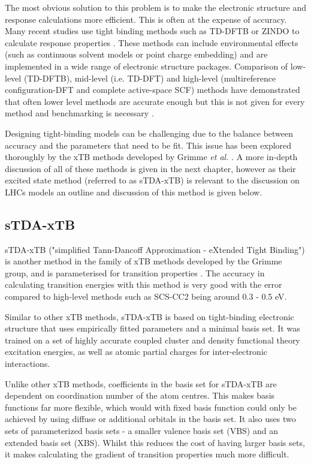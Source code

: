 The most obvious solution to this problem is to make the electronic structure and
response calculations more efficient. This is often at the expense of accuracy.
Many recent studies use tight binding methods such as TD-DFTB or ZINDO to calculate
response properties \cite{Jurinovich2015, Olbrich2010, Curutchet2011, Curutchet2012}.
These methods can include environmental effects (such as continuous solvent models 
or point charge embedding) and are implemented in a wide range of electronic structure
packages. Comparison of low-level (TD-DFTB), mid-level (i.e. TD-DFT) and high-level
(multireference configuration-DFT and complete active-space SCF) methods have demonstrated
that often lower level methods are accurate enough but this is not given for every
method and benchmarking is necessary \cite{Andreussi2015, Hansen2019, Poddubnyy2021}.

Designing tight-binding models can be challenging due to the balance between accuracy
and the parameters that need to be fit. This issue has been explored thoroughly 
by the xTB methods developed by Grimme \emph{et al.} \cite{Bannwarth2020}. A more
in-depth discussion of all of these methods is given in the next chapter, however
as their excited state method (referred to as sTDA-xTB) is relevant to the discussion
on LHCs models an outline and discussion of this method is given below.

\subsection{sTDA-xTB}
\label{subsec:stda_xtb}
sTDA-xTB ("simplified Tann-Dancoff Approximation - eXtended Tight Binding") is another
method in the family of xTB methods developed by the Grimme group, and is parameterised
for transition properties \cite{Grimme2016}. The accuracy in calculating transition
energies with this method is very good with the error compared to high-level methods
such as SCS-CC2 being around 0.3 - 0.5 eV.

Similar to other xTB methods, sTDA-xTB is based on tight-binding electronic structure
that uses empirically fitted parameters and a minimal basis set. It was trained 
on a set of highly accurate coupled cluster and density functional theory excitation 
energies, as well as atomic partial charges for inter-electronic interactions.

Unlike other xTB methods, coefficients in the basis set for sTDA-xTB are dependent
on coordination number of the atom centres. This makes basis functions far more 
flexible, which would with fixed basis function could only be achieved by using 
diffuse or additional orbitals in the basis set. It also uses two sets of parameterized 
basis sets - a smaller valence basis set (VBS) and an extended basis set (XBS).
Whilst this reduces the cost of having larger basis sets, it makes calculating the
gradient of transition properties much more difficult.

